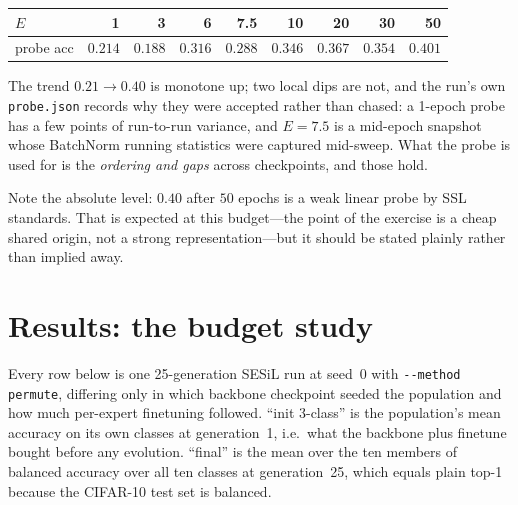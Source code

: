 \documentclass[11pt,a4paper]{article}
\newcommand{\code}[1]{\texttt{\small #1}}
\begin{document}
\begin{center}
\begin{tabular}{@{}lrrrrrrrr@{}}
\toprule
$E$ & 1 & 3 & 6 & 7.5 & 10 & 20 & 30 & 50 \\
\midrule
probe acc & $0.214$ & $0.188$ & $0.316$ & $0.288$ & $0.346$ & $0.367$ &
$0.354$ & $\mathbf{0.401}$ \\
\bottomrule
\end{tabular}
\end{center}

The trend $0.21 \to 0.40$ is monotone up; two local dips are not, and the
run's own \code{probe.json} records why they were accepted rather than chased:
a 1-epoch probe has a few points of run-to-run variance, and $E{=}7.5$ is a
mid-epoch snapshot whose BatchNorm running statistics were captured mid-sweep.
What the probe is used for is the \emph{ordering and gaps} across checkpoints,
and those hold.

Note the absolute level: $0.40$ after $50$ epochs is a weak linear probe by SSL
standards. That is expected at this budget---the point of the exercise is a
cheap shared origin, not a strong representation---but it should be stated
plainly rather than implied away.

\section{Results: the budget study}

Every row below is one 25-generation SESiL run at seed~0 with
\code{-{}-method permute}, differing only in which backbone checkpoint seeded
the population and how much per-expert finetuning followed. ``init 3-class''
is the population's mean accuracy on its own classes at generation~1, i.e.\
what the backbone plus finetune bought before any evolution. ``final'' is the
mean over the ten members of balanced accuracy over all ten classes at
generation~25, which equals plain top-1 because the CIFAR-10 test set is
balanced.
\end{document}
